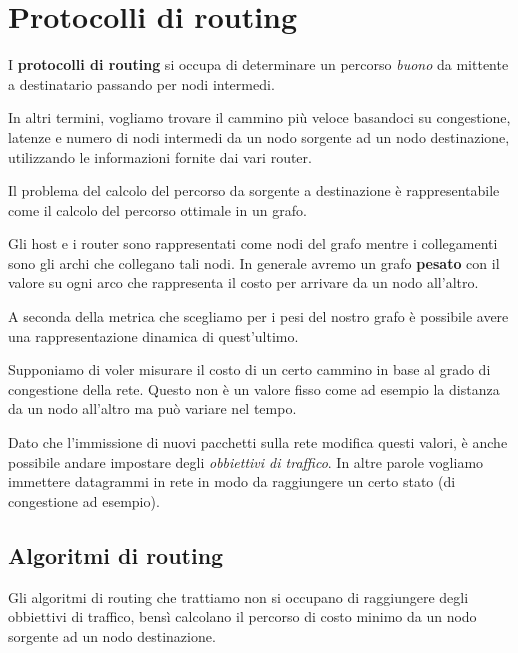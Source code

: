\section{Protocolli di routing}
I \textbf{protocolli di routing} si occupa di determinare un percorso
\emph{buono} da mittente a destinatario passando per nodi intermedi.

In altri termini, vogliamo trovare il cammino più veloce basandoci
su congestione, latenze e numero di nodi intermedi da un nodo sorgente 
ad un nodo destinazione, utilizzando le informazioni fornite dai vari
router.

Il problema del calcolo del percorso da sorgente a destinazione è 
rappresentabile come il calcolo del percorso ottimale in un grafo.

Gli host e i router sono rappresentati come nodi del grafo mentre i
collegamenti sono gli archi che collegano tali nodi. In generale avremo
un grafo \textbf{pesato} con il valore su ogni arco che rappresenta il 
costo per arrivare da un nodo all'altro.

A seconda della metrica che scegliamo per i pesi del nostro grafo è
possibile avere una rappresentazione dinamica di quest'ultimo. 

Supponiamo di voler misurare il costo di un certo cammino in base al 
grado di congestione della rete. Questo non è un valore fisso come ad
esempio la distanza da un nodo all'altro ma può variare nel tempo.

Dato che l'immissione di nuovi pacchetti sulla rete modifica questi 
valori, è anche possibile andare impostare degli \emph{obbiettivi di 
traffico}. In altre parole vogliamo immettere datagrammi in rete in modo
da raggiungere un certo stato (di congestione ad esempio).

\subsection{Algoritmi di routing}
Gli algoritmi di routing che trattiamo non si occupano di raggiungere
degli obbiettivi di traffico, bensì calcolano il percorso di costo 
minimo da un nodo sorgente ad un nodo destinazione.

